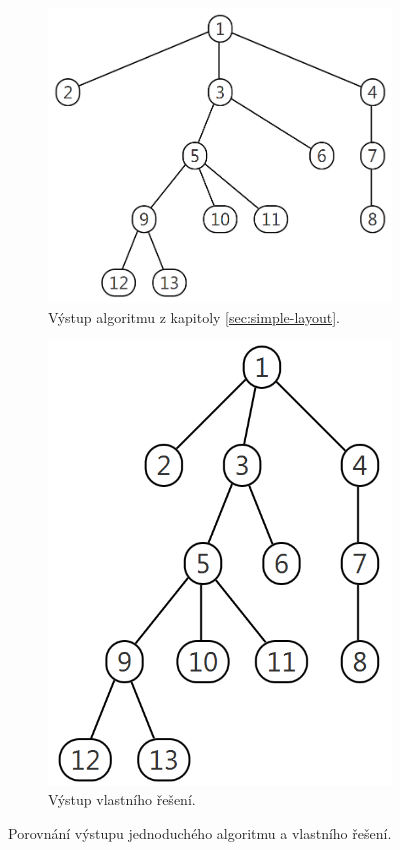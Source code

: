 \documentclass[12pt, a4paper]{report}
\begin{document}
\begin{figure}[ph]
	\centering
	\begin{subfigure}{0.5\textwidth}
		\centering
		\includegraphics[height=0.8\linewidth]{img-simple-layout}
		\caption{Výstup algoritmu z kapitoly \ref{sec:simple-layout}.}
		\label{fig:compare-1}
	\end{subfigure}%
	\begin{subfigure}{0.5\textwidth}
		\centering
		\includegraphics[height=0.8\linewidth]{img-my-layout}
		\caption{Výstup vlastního řešení.}
		\label{fig:compare-2}
	\end{subfigure}
	\caption{Porovnání výstupu jednoduchého algoritmu a vlastního řešení.}
	\label{fig:compare}
\end{figure}
\end{document}
